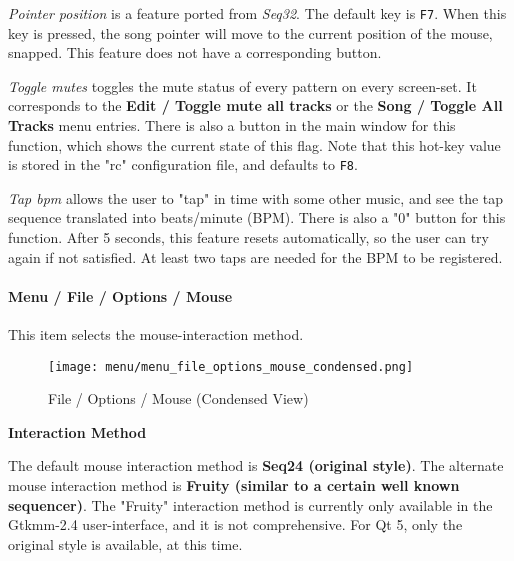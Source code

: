    \textsl{Pointer position} is a feature ported from \textsl{Seq32}.
   The default key is \texttt{F7}.
   When this key is pressed, the song pointer will move to the
   current position of the mouse, snapped.
   This feature does not have a corresponding button.

   \textsl{Toggle mutes} toggles the mute status of every
   pattern on every screen-set.  It corresponds to the
   \textbf{Edit / Toggle mute all tracks} or the 
   \textbf{Song / Toggle All Tracks}
   menu entries.  There is also a button in the main window for this function,
   which shows the current state of this flag.  Note that this
   hot-key value is stored in the "rc" configuration file, and
   defaults to \texttt{F8}.

   \textsl{Tap bpm} allows the user to "tap" in time with some
   other music, and see the tap sequence translated into beats/minute (BPM).
   There is also a "0" button for this function.
   After 5 seconds, this feature resets automatically, so the user can try
   again if not satisfied.  At least two taps are needed for the
   BPM to be registered.

%

\paragraph{Menu / File / Options / Mouse }
\label{paragraph:seq64_menu_file_options_mouse}

   This item selects the mouse-interaction method.

\begin{figure}[H]
   \centering 
   \texttt{[image: menu/menu\_file\_options\_mouse\_condensed.png]}
   \caption{File / Options / Mouse (Condensed View)}
   \label{fig:seq64_menu_file_options_mouse}
\end{figure}

   \textbf{Interaction Method}

   The default mouse interaction method is \textbf{Seq24 (original style)}.
   The alternate mouse interaction method is \textbf{Fruity (similar to a
   certain well known sequencer)}.
   The "Fruity" interaction method
   is currently only available in the Gtkmm-2.4 user-interface, and it
   is not comprehensive.
   For Qt 5, only the original style is available, at this time.

